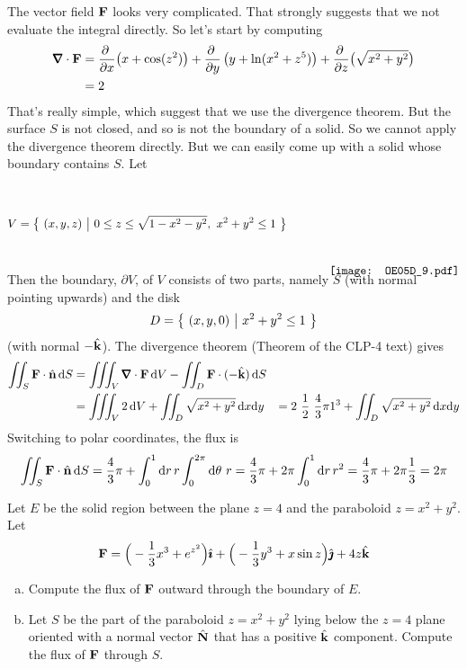 \begin{solution}
The vector field $\mathbf{F}$ looks very complicated. 
That strongly suggests that we not evaluate the integral directly.
So let's start by computing
\begin{align*}
\vnabla\cdot\vF &= 
    \pdiff{}{x}\big(x + \cos(z^2)\big)
     +\pdiff{}{y}\left(y + \ln(x^2 + z^5)\right)
     +\pdiff{}{z}\big(\sqrt{x^2 + y^2}\big) \\
   &=   2
\end{align*}
That's really simple, which suggest that we use the divergence theorem.
But the surface $S$ is not closed, and so is not the boundary of a solid.
So we cannot apply the divergence theorem directly. But we can easily
come up with a solid whose boundary contains $S$. Let
\begin{equation*}
V=\Set{(x,y,z)}{0\le z\le \sqrt{1-x^2-y^2},\ x^2+y^2\le 1}
    \hskip0.5in\raisebox{-40pt}[40pt][30pt]
                         {\texttt{[image: OE05D\_9.pdf]}}
\end{equation*}
Then the boundary, $\partial V$, of $V$ consists of two parts, namely $S$
(with normal pointing upwards) and the disk
\begin{equation*}
D=\big\{ \ (x,y,0)\ \big|\ x^2+y^2\le 1\ \big\}
\end{equation*}
(with normal $-\hat{\mathbf{k}}$).  The divergence theorem 
(Theorem  of the CLP-4 text) gives
\begin{align*}
\dblInt_S \vF \cdot \hn\,\dee{S}
&=\tripInt_V \vnabla\cdot\vF\,\dee{V}
    -\dblInt_D \vF \cdot (-\hk)\,\dee{S} \\
&=\tripInt_V 2\,\dee{V}
  +\dblInt_D \sqrt{x^2+y^2}\,\dee{x}\dee{y} 
&=2\ \frac{1}{2}\ \frac{4}{3}\pi 1^3
  +\dblInt_D \sqrt{x^2+y^2}\,\dee{x}\dee{y} 
\end{align*}
Switching to polar coordinates, the flux is
\begin{align*}
\iint_S \mathbf{F}\cdot\hat{\mathbf{n}}\,\mathrm{d}S
=\frac{4}{3}\pi+\int_0^1\mathrm{d}r\,r\int_0^{2\pi}\mathrm{d}\theta\ r
=\frac{4}{3}\pi + 2\pi \int_0^1 \mathrm{d}r\, r^2
=\frac{4}{3}\pi + 2\pi \frac{1}{3}
=2\pi
\end{align*}

\end{solution}

\begin{question}
Let $E$ be the solid region between the plane $z = 4$ and the paraboloid 
$z = x^2 + y^2$. Let
\begin{equation*}
\mathbf{F} = \Big(-\frac{1}{3}x^3 + e^{z^2}\Big)\hat{\pmb{\imath}} 
     + \Big(-\frac{1}{3}y^3 + x\sin z\Big)\hat{\pmb{\jmath}} + 4z\hat{\mathbf{k}}
\end{equation*}
\begin{enumerate}[(a)]
\item
Compute the flux of $\mathbf{F}$ outward through the boundary of $E$.

\item
Let $S$ be the part of the paraboloid $z = x^2 + y^2$ lying below the 
$z = 4$ plane oriented with a normal vector $\hat{\mathbf{N}}$ that has a positive $\hat{\mathbf{k}}$ component. 
Compute the flux of $\mathbf{F}$ through $S$.
\end{enumerate}

\end{question}

